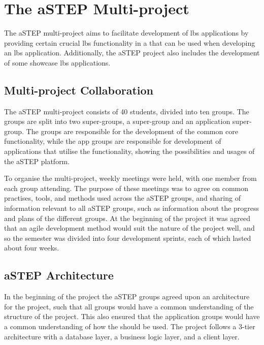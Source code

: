 \section{The aSTEP Multi-project} \label{sec:astep}
The aSTEP multi-project aims to facilitate development of \gls{lbs} applications by providing certain crucial \gls{lbs} functionality in a  that can be used when developing an \gls{lbs} application. Additionally, the aSTEP project also includes the development of some showcase \gls{lbs} applications.

\subsection{Multi-project Collaboration}
The aSTEP multi-project consists of 40 students, divided into ten groups. The groups are split into two super-groups, a  super-group and an application super-group. The  groups are responsible for the development of the common core functionality, while the app groups are responsible for development of applications that utilise the  functionality, showing the possibilities and usages of the aSTEP  platform. 

To organise the multi-project, weekly meetings were held, with one member from each group attending. The purpose of these meetings was to agree on common practises, tools, and methods used across the aSTEP groups, and sharing of information relevant to all aSTEP groups, such as information about the progress and plans of the different groups. At the beginning of the project it was agreed that an agile development method would suit the nature of the project well, and so the semester was divided into four development sprints, each of which lasted about four weeks.

\subsection{aSTEP Architecture}
In the beginning of the project the aSTEP groups agreed upon an architecture for the project, such that all groups would have a common understanding of the structure of the project. This also ensured that the application groups would have a common understanding of how the  should be used. The project follows a 3-tier architecture with a database layer, a business logic layer, and a client layer. 

